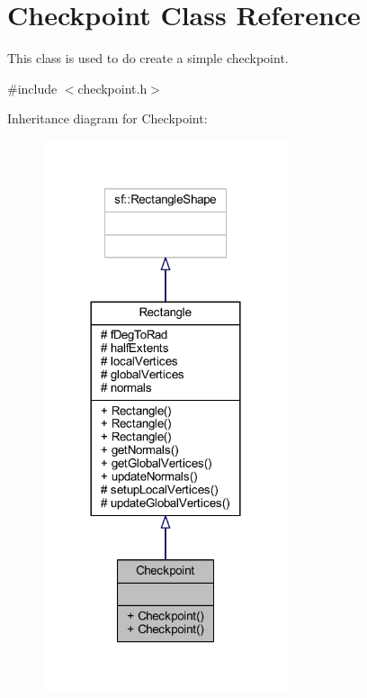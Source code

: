 \hypertarget{class_checkpoint}{}\section{Checkpoint Class Reference}
\label{class_checkpoint}


This class is used to do create a simple checkpoint.  




{\ttfamily \#include $<$checkpoint.\+h$>$}



Inheritance diagram for Checkpoint\+:\nopagebreak
\begin{figure}[H]
\begin{center}
\leavevmode
\includegraphics[width=204pt]{class_checkpoint__inherit__graph}
\end{center}
\end{figure}


